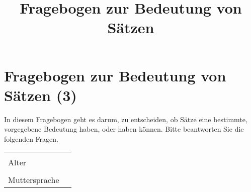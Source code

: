 \documentclass[a4paper, 8pt]{article}
\title{Fragebogen zur Bedeutung von Sätzen}
\begin{document}
\section*{Fragebogen zur Bedeutung von Sätzen (3)}

In diesem Fragebogen geht es darum, zu entscheiden, ob Sätze eine bestimmte, vorgegebene Bedeutung haben, oder haben können. Bitte beantworten Sie die folgenden Fragen.


\begin{tabular}{|l|p{5cm}|}
\hline
& \\
Alter & \\
\hline
& \\
Muttersprache & \\
\hline
\end{tabular}
\end{document}
